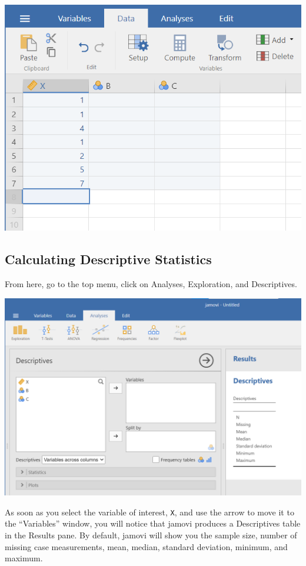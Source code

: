 \documentclass[
]{book}
\begin{document}
\includegraphics{img/2.5.1.png}

\hypertarget{calculating-descriptive-statistics-1}{%
\subsection{Calculating Descriptive Statistics}\label{calculating-descriptive-statistics-1}}

From here, go to the top menu, click on {Analyses}, {Exploration}, and {Descriptives}.

\includegraphics{img/2.5.2.png}

As soon as you select the variable of interest, \texttt{X}, and use the arrow to move it to the ``Variables'' window, you will notice that jamovi produces a Descriptives table in the Results pane. By default, jamovi will show you the sample size, number of missing case measurements, mean, median, standard deviation, minimum, and maximum.
\end{document}

